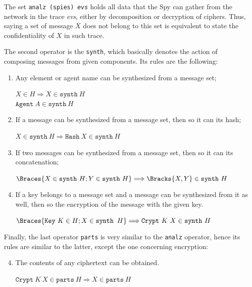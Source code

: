 The set \texttt{analz (spies) \textit{evs}} holds all data that the Spy can gather from the network in the trace \textit{evs}, either by decomposition or decryption of ciphers. Thus, saying a set of message \(X\) does not belong to this set is equivalent to state the confidentiality of \(X\) in such trace.

The second operator is the \texttt{synth}, which basically denotes the action of composing messages from given components. Its rules are the following:

\begin{enumerate}
  \item Any element or agent name can be synthesized from a message set;
  \begin{center}
    \(X \in H \Longrightarrow X \in \texttt{synth}\ H\) \\
    \(\texttt{Agent}\ A \in \texttt{synth}\ H\)
  \end{center}

  \item If a message can be synthesized from a message set, then so it can its hash;
  \begin{center}
    \(X \in \texttt{synth}\ H \Longrightarrow \texttt{Hash}\ X \in \texttt{synth}\ H\)
  \end{center}

  \item If two messages can be synthesized from a message set, then so it can its concatenation;
  \begin{center}
    \(\Braces{X \in \texttt{synth}\ H; Y \in \texttt{synth}\ H} \Longrightarrow \Bracks{X,Y} \in \texttt{synth}\ H\)
  \end{center}

  \item If a key belongs to a message set and a message can be synthesized from it as well, then so the encryption of the message with the given key.
  \begin{center}
    \(\Braces{\texttt{Key}\ K \in H; X \in \texttt{synth } H} \Longrightarrow \texttt{Crypt}\ K\ X \in \texttt{synth}\ H\)
  \end{center}
\end{enumerate}

Finally, the last operator \texttt{parts} is very similar to the \texttt{analz} operator, hence its rules are similar to the latter, except the one concerning encryption:

\begin{enumerate} \setcounter{enumi}{3}
  \item The contents of any ciphertext can be obtained.
  \begin{center}
    \(\texttt{Crypt}\ K\ X \in \texttt{parts}\ H \Longrightarrow X \in \texttt{parts}\ H\)
  \end{center}
\end{enumerate}

